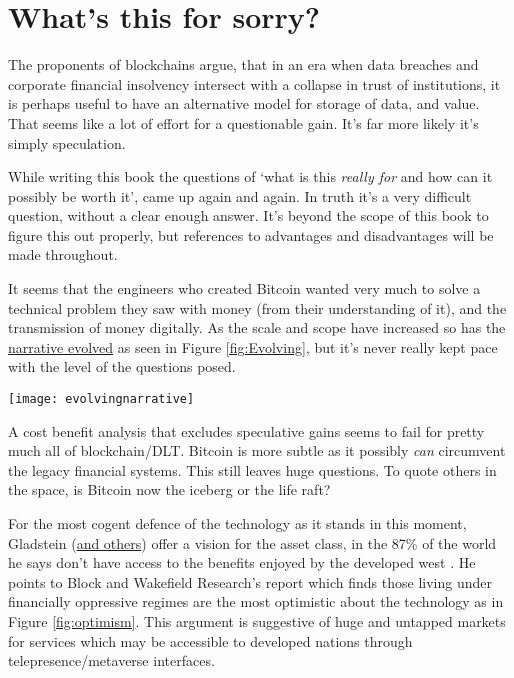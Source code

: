 \section{What's this for sorry?}
The proponents of blockchains argue, that in an era when data breaches and corporate financial insolvency intersect with a collapse in trust of institutions, it is perhaps useful to have an alternative model for storage of data, and value. That seems like a lot of effort for a questionable gain. It's far more likely it's simply speculation.\par 
While writing this book the questions of `what is this \textit{really for} and how can it possibly be worth it', came up again and again. In truth it's a very difficult question, without a clear enough answer. It's beyond the scope of this book to figure this out properly, but references to advantages and disadvantages will be made throughout.\par  
It seems that the engineers who created Bitcoin wanted very much to solve a technical problem they saw with money (from their understanding of it), and the transmission of money digitally. As the scale and scope have increased so has the \href{https://medium.com/@nic__carter/visions-of-bitcoin-4b7b7cbcd24c}{narrative evolved} as seen in Figure \ref{fig:Evolving}, but it's never really kept pace with the level of the questions posed. \par
\begin{figure*}[ht]\centering %
	\texttt{[image: evolvingnarrative]}
	\caption{The narrative use of Bitcoin has evolved, by Nic Carter and Hasufly.}
	\label{fig:Evolving}
\end{figure*}
A cost benefit analysis that excludes speculative gains seems to fail for pretty much all of blockchain/DLT. Bitcoin is more subtle as it possibly \textit{can} circumvent the legacy financial systems. This still leaves huge questions. To quote others in the space, is Bitcoin now the iceberg or the life raft? \par 
For the most cogent defence of the technology as it stands in this moment, Gladstein (\href{https://www.financialinclusion.tech/}{and others}) offer a vision for the asset class, in the 87\% of the world he says don't have access to the benefits enjoyed by the developed west \cite{gladsteincheck2022}. He points to Block and Wakefield Research's report which finds those living under financially oppressive regimes are the most optimistic about the technology as in Figure \ref{fig:optimism}. This argument is suggestive of huge and untapped markets for services which may be accessible to developed nations through telepresence/metaverse interfaces.\par 
